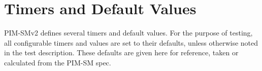 \documentclass[11pt]{report}
\begin{document}
\section{Timers and Default Values}
PIM-SMv2 defines several timers and default values. For the purpose of
testing, all configurable timers and values are set to their defaults, unless
otherwise noted in the test description. These defaults are given here for
reference, taken or calculated from the PIM-SM spec.

%
%
\newcommand{\PimsmVersionDefault}{PIM-SMv2}	       %
\newcommand{\PimsmLanDelayDefault}{0.5 sec}		%
\newcommand{\PimsmTOverrideDefault}{2.5 sec}		%
\newcommand{\PimsmHelloPeriod}{30 sec}			%
\newcommand{\PimsmTriggeredHelloDelay}{5 sec}		%
\newcommand{\PimsmDefaultHelloHoldtime}{105 sec}       %
\newcommand{\PimsmHelloHoldtime}{105 sec}		%
\newcommand{\PimsmJPHoldTime}{210}			%
\newcommand{\PimsmJPOverrideIntervalI}{3 sec}	     %
\newcommand{\PimsmAssertOverrideInterval}{3 sec}     %
\newcommand{\PimsmAssertTime}{180 sec}			%
\newcommand{\PimsmTPeriodic}{60 sec}			%
\newcommand{\PimsmTSuppressed}{rand(66, 84) sec}	%
\newcommand{\PimsmTOverride}{rand(0, 2.5) sec}		%
\newcommand{\PimsmKeepalivePeriod}{210 sec}		%
\newcommand{\PimsmRPKeepalivePeriod}{185 sec}		%
\newcommand{\PimsmRegisterSuppressionTime}{60 sec}  %
\newcommand{\PimsmRegisterProbeTime}{5 sec}		%

%
%
\newcommand{\PimsmBSPeriod}{60 sec}			%
\newcommand{\PimsmBSTimeout}{130 sec}			%
\newcommand{\PimsmRandOverride}{rand(0, 5.0) sec}	%
\newcommand{\PimsmCRPTimeout}{150 sec}			%
\newcommand{\PimsmCRPAdvPeriod}{60 sec}			%
\newcommand{\PimsmSZTimeout}{1500 sec}			%
\end{document}
